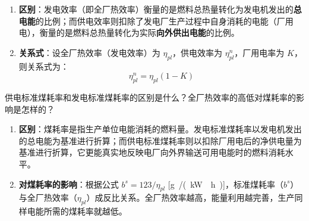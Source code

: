 \begin{solution}
\begin{enumerate}
  \item \textbf{区别}：发电效率（即全厂热效率）衡量的是燃料总热量转化为发电机发出的\textbf{总电能}的比例；而供电效率则扣除了发电厂生产过程中自身消耗的电能（厂用电），衡量的是燃料总热量转化为实际\textbf{向外供出电能}的比例。
  \item \textbf{关系式}：设全厂热效率（发电效率）为 \(\eta_{pl}\)，供电效率为 \(\eta_{pl}^n\)，厂用电率为 \(K\)，则关系式为：
  \begin{equation*}
    \eta_{pl}^n = \eta_{pl}(1 - K)
  \end{equation*}
\end{enumerate}
\end{solution}

\begin{problem}
供电标准煤耗率和发电标准煤耗率的区别是什么？全厂热效率的高低对煤耗率的影响是怎样的？
\end{problem}

\begin{solution}
\begin{enumerate}
  \item \textbf{区别}：煤耗率是指生产单位电能消耗的燃料量。发电标准煤耗率以发电机发出的总电能为基准进行折算；而供电标准煤耗率则以扣除厂用电后的净供电量为基准进行折算，它更能真实地反映电厂向外界输送可用电能时的燃料消耗水平。
  \item \textbf{对煤耗率的影响}：根据公式 \(b^s = 123 / \eta_{pl}\) [\unit{g /(kW\cdot h)}]，标准煤耗率（\(b^s\)）与全厂热效率（\(\eta_{pl}\)）成反比关系。全厂热效率越高，能量利用越完善，生产同样电能所需的煤耗率就越低。
\end{enumerate}
\end{solution}

